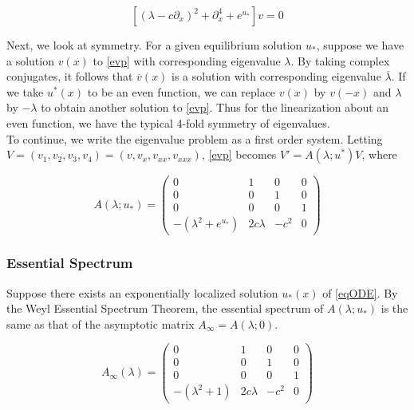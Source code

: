 \documentclass[12pt]{article}
\begin{document}
\begin{equation}\label{evp2}
[(\lambda - c \partial_x)^2 + \partial_x^4 + e^{u_*}]v = 0
\end{equation}

Next, we look at symmetry. For a given equilibrium solution $u_*$, suppose we have a solution $v(x)$ to \eqref{evp} with corresponding eigenvalue $\lambda$. By taking complex conjugates, it follows that $\overline{v}(x)$ is a solution with corresponding eigenvalue $\overline{\lambda}$. If we take $u^*(x)$ to be an even function, we can replace $v(x)$ by $v(-x)$ and $\lambda$ by $-\lambda$ to obtain another solution to \eqref{evp}. Thus for the linearization about an even function, we have the typical 4-fold symmetry of eigenvalues.\\ 

To continue, we write the eigenvalue problem as a first order system. Letting $V = (v_1, v_2, v_3, v_4) = (v, v_x, v_{xx}, v_{xxx})$, \eqref{evp} becomes $V' = A(\lambda; u^*)V$, where

\begin{equation}\label{evpsystem}
A(\lambda; u_*) = \begin{pmatrix}
0 & 1 & 0 & 0 \\
0 & 0 & 1 & 0 \\
0 & 0 & 0 & 1 \\
-(\lambda^2 + e^{u_*}) & 2 c \lambda & -c^2 & 0 
\end{pmatrix}
\end{equation}

\subsubsection{Essential Spectrum}

Suppose there exists an exponentially localized solution $u_*(x)$ of \eqref{eqODE}. By the Weyl Essential Spectrum Theorem, the essential spectrum of $A(\lambda; u_*)$ is the same as that of the asymptotic matrix $A_\infty = A(\lambda; 0)$.

\begin{equation}\label{Ainf}
A_\infty(\lambda) = \begin{pmatrix}
0 & 1 & 0 & 0 \\ 
0 & 0 & 1 & 0 \\
0 & 0 & 0 & 1 \\
-(\lambda^2 + 1) & 2 c \lambda & -c^2 & 0 
\end{pmatrix}
\end{equation}
\end{document}
